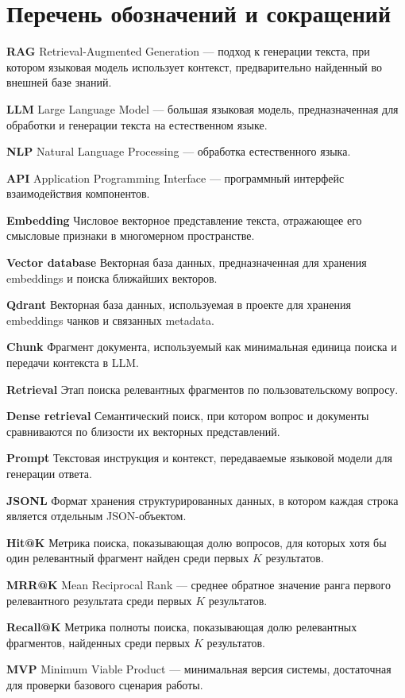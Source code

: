 \chapter*{Перечень обозначений и сокращений}

\begingroup
\setlength{\parindent}{0pt}
\setlength{\parskip}{0.45\baselineskip}

\textbf{RAG} Retrieval-Augmented Generation — подход к генерации текста, при котором языковая модель использует контекст, предварительно найденный во внешней базе знаний.

\textbf{LLM} Large Language Model — большая языковая модель, предназначенная для обработки и генерации текста на естественном языке.

\textbf{NLP} Natural Language Processing — обработка естественного языка.

\textbf{API} Application Programming Interface — программный интерфейс взаимодействия компонентов.

\textbf{Embedding} Числовое векторное представление текста, отражающее его смысловые признаки в многомерном пространстве.

\textbf{Vector database} Векторная база данных, предназначенная для хранения embeddings и поиска ближайших векторов.

\textbf{Qdrant} Векторная база данных, используемая в проекте для хранения embeddings чанков и связанных metadata.

\textbf{Chunk} Фрагмент документа, используемый как минимальная единица поиска и передачи контекста в LLM.

\textbf{Retrieval} Этап поиска релевантных фрагментов по пользовательскому вопросу.

\textbf{Dense retrieval} Семантический поиск, при котором вопрос и документы сравниваются по близости их векторных представлений.

\textbf{Prompt} Текстовая инструкция и контекст, передаваемые языковой модели для генерации ответа.

\textbf{JSONL} Формат хранения структурированных данных, в котором каждая строка является отдельным JSON-объектом.

\textbf{Hit@K} Метрика поиска, показывающая долю вопросов, для которых хотя бы один релевантный фрагмент найден среди первых $K$ результатов.

\textbf{MRR@K} Mean Reciprocal Rank — среднее обратное значение ранга первого релевантного результата среди первых $K$ результатов.

\textbf{Recall@K} Метрика полноты поиска, показывающая долю релевантных фрагментов, найденных среди первых $K$ результатов.

\textbf{MVP} Minimum Viable Product — минимальная версия системы, достаточная для проверки базового сценария работы.
\endgroup

